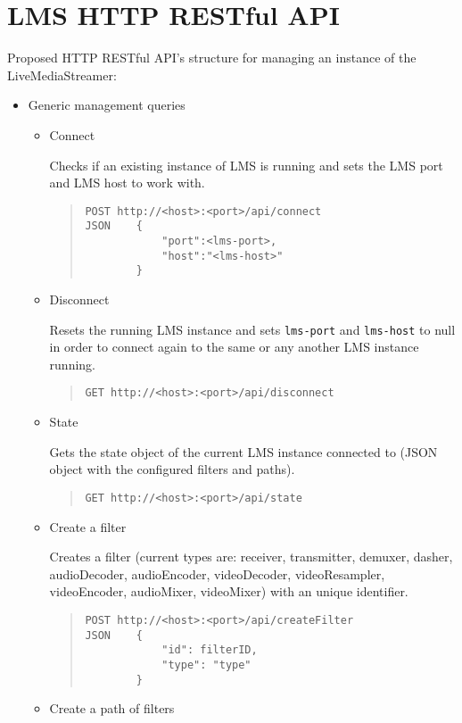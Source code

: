 \chapter{LMS HTTP RESTful API}\label{ANX:RESTAPI}

Proposed HTTP RESTful API's structure for managing an instance of the LiveMediaStreamer:

\begin{itemize}
\item Generic management queries
\begin{itemize}
\item Connect \hfill

Checks if an existing instance of LMS is running and sets the LMS port and LMS host to work with.
\begin{quote}
\begin{verbatim}
POST http://<host>:<port>/api/connect
JSON    {
            "port":<lms-port>,
            "host":"<lms-host>"
        }
\end{verbatim}
\end{quote}
\item Disconnect \hfill

Resets the running LMS instance and sets \verb|lms-port| and \verb|lms-host| to null in order to connect again to the same or any another LMS instance running.
\begin{quote}
\begin{verbatim}
GET http://<host>:<port>/api/disconnect
\end{verbatim}
\end{quote}
\item State \hfill

Gets the state object of the current LMS instance connected to (JSON object with the configured filters and paths).
\begin{quote}
\begin{verbatim}
GET http://<host>:<port>/api/state
\end{verbatim}
\end{quote}
\item Create a filter \hfill

Creates a filter (current types are: receiver, transmitter, demuxer, dasher, audioDecoder, audioEncoder, videoDecoder, videoResampler, videoEncoder, audioMixer, videoMixer) with an unique identifier.
\begin{quote}
\begin{verbatim}
POST http://<host>:<port>/api/createFilter
JSON    {
            "id": filterID,
            "type": "type"
        }
\end{verbatim}
\end{quote}        
\item Create a path of filters \hfill


\end{itemize}
\end{itemize}
